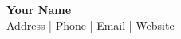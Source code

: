 \documentclass[12pt]{resume}  %
\begin{document}
\begin{center}
    {\Huge \textbf{Your Name}}\\[1ex]
    Address | Phone | Email | Website
\end{center}
\vspace{1em}




\end{document}
